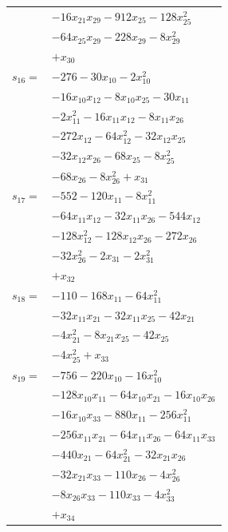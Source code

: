 \begin{longtable}{@{}r@{\;}l@{}}
 & \(\displaystyle -16x_{21}x_{29} -912x_{25} -128x_{25}^{2}\) \\
 & \(\displaystyle -64x_{25}x_{29} -228x_{29} -8x_{29}^{2}\) \\
 & \(\displaystyle +x_{30}\) \\[3pt]
\(s_{16}=\) & \(\displaystyle -276 -30x_{10} -2x_{10}^{2}\) \\
 & \(\displaystyle -16x_{10}x_{12} -8x_{10}x_{25} -30x_{11}\) \\
 & \(\displaystyle -2x_{11}^{2} -16x_{11}x_{12} -8x_{11}x_{26}\) \\
 & \(\displaystyle -272x_{12} -64x_{12}^{2} -32x_{12}x_{25}\) \\
 & \(\displaystyle -32x_{12}x_{26} -68x_{25} -8x_{25}^{2}\) \\
 & \(\displaystyle -68x_{26} -8x_{26}^{2} +x_{31}\) \\[3pt]
\(s_{17}=\) & \(\displaystyle -552 -120x_{11} -8x_{11}^{2}\) \\
 & \(\displaystyle -64x_{11}x_{12} -32x_{11}x_{26} -544x_{12}\) \\
 & \(\displaystyle -128x_{12}^{2} -128x_{12}x_{26} -272x_{26}\) \\
 & \(\displaystyle -32x_{26}^{2} -2x_{31} -2x_{31}^{2}\) \\
 & \(\displaystyle +x_{32}\) \\[3pt]
\(s_{18}=\) & \(\displaystyle -110 -168x_{11} -64x_{11}^{2}\) \\
 & \(\displaystyle -32x_{11}x_{21} -32x_{11}x_{25} -42x_{21}\) \\
 & \(\displaystyle -4x_{21}^{2} -8x_{21}x_{25} -42x_{25}\) \\
 & \(\displaystyle -4x_{25}^{2} +x_{33}\) \\[3pt]
\(s_{19}=\) & \(\displaystyle -756 -220x_{10} -16x_{10}^{2}\) \\
 & \(\displaystyle -128x_{10}x_{11} -64x_{10}x_{21} -16x_{10}x_{26}\) \\
 & \(\displaystyle -16x_{10}x_{33} -880x_{11} -256x_{11}^{2}\) \\
 & \(\displaystyle -256x_{11}x_{21} -64x_{11}x_{26} -64x_{11}x_{33}\) \\
 & \(\displaystyle -440x_{21} -64x_{21}^{2} -32x_{21}x_{26}\) \\
 & \(\displaystyle -32x_{21}x_{33} -110x_{26} -4x_{26}^{2}\) \\
 & \(\displaystyle -8x_{26}x_{33} -110x_{33} -4x_{33}^{2}\) \\
 & \(\displaystyle +x_{34}\) \\[3pt]

\end{longtable}
